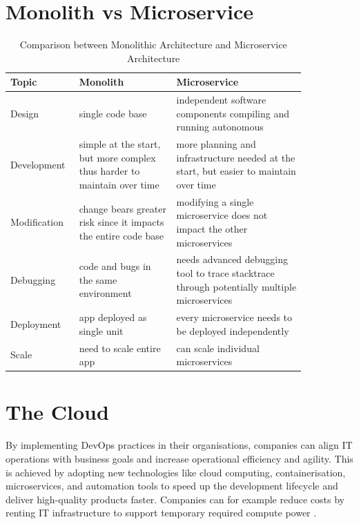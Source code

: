 \documentclass[BIF,Bachelor,nenglish]{twbook}%
\begin{document}
\section{Monolith vs Microservice}
\begin{table}[!h]
    \centering
    \begin{tabular}{|p{0.15\linewidth}|p{0.3\linewidth}|p{0.4\linewidth}|}
    \hline
        \textbf{Topic} & \textbf{Monolith} & \textbf{Microservice} \\ \hline
        Design & single code base & independent software components compiling and running autonomous \\ \hline
        Development & simple at the start, but more complex thus harder to maintain over time & more planning and infrastructure needed at the start, but easier to maintain over time \\ \hline
        Modification & change bears greater risk since it impacts the entire code base & modifying a single microservice does not impact the other microservices \\ \hline
        Debugging & code and bugs in the same environment & needs advanced debugging tool to trace stacktrace through potentially multiple microservices \\ \hline
        Deployment & app deployed as single unit & every microservice needs to be deployed independently \\ \hline
        Scale & need to scale entire app & can scale individual microservices \\ \hline
    \end{tabular}
    \caption{Comparison between Monolithic Architecture and Microservice Architecture}
\end{table}

\section{The Cloud}
By implementing DevOps practices in their organisations, companies can align IT operations with business goals and increase operational efficiency and agility. This is achieved by adopting new technologies like cloud computing, containerisation, microservices, and automation tools to speed up the development lifecycle and deliver high-quality products faster. Companies can for example reduce costs by renting IT infrastructure to support temporary required compute power \cite{qia2009}.
\end{document}
